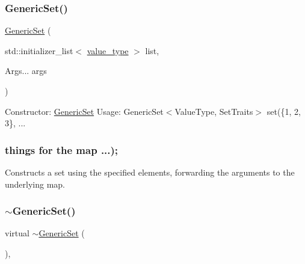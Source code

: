 \subsubsection{\texorpdfstring{Generic\+Set()}{GenericSet()}\hspace{0.1cm}{\footnotesize\ttfamily [4/4]}}
{\footnotesize\ttfamily \mbox{\hyperlink{classstanfordcpplib_1_1collections_1_1GenericSet}{Generic\+Set}} (\begin{DoxyParamCaption}\item[{std\+::initializer\+\_\+list$<$ \mbox{\hyperlink{classstanfordcpplib_1_1collections_1_1GenericSet_a669c81f158766925e7293f97c0099b28}{value\+\_\+type}} $>$}]{list,  }\item[{Args...}]{args }\end{DoxyParamCaption})}



Constructor\+: \mbox{\hyperlink{classstanfordcpplib_1_1collections_1_1GenericSet}{Generic\+Set}} Usage\+: Generic\+Set$<$\+Value\+Type, Set\+Traits$>$ set(\{1, 2, 3\}, ... 

\subsubsection*{things for the map ...); }

Constructs a set using the specified elements, forwarding the arguments to the underlying map. \mbox{\label{classstanfordcpplib_1_1collections_1_1GenericSet_ab221b36dcc150632e4f355130d16f377}} 
\subsubsection{\texorpdfstring{$\sim$\+Generic\+Set()}{~GenericSet()}}
{\footnotesize\ttfamily virtual $\sim$\mbox{\hyperlink{classstanfordcpplib_1_1collections_1_1GenericSet}{Generic\+Set}} (\begin{DoxyParamCaption}{ }\end{DoxyParamCaption})\hspace{0.3cm}{\ttfamily [virtual]}, {\ttfamily [default]}}




